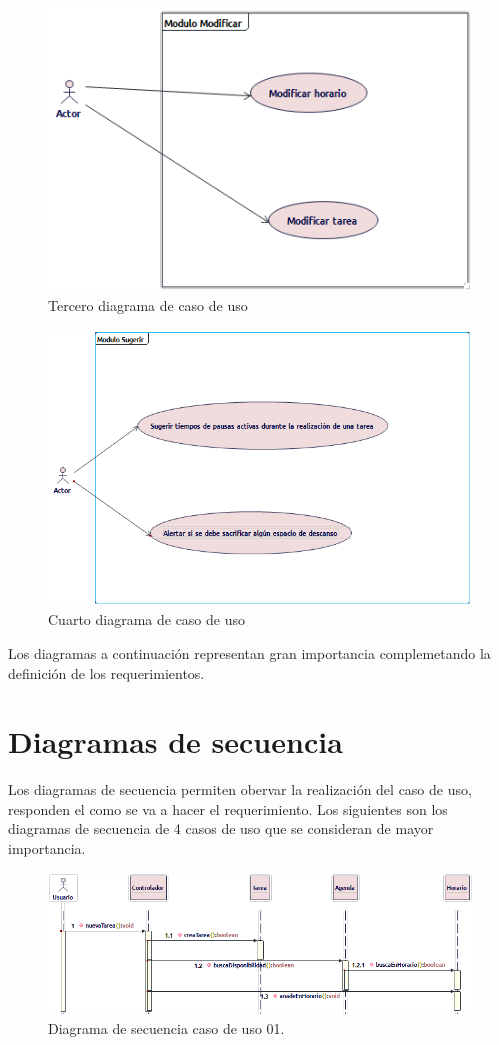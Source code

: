 \begin{figure}[H]
	\centering
	\includegraphics[width=0.7\linewidth]{diseno/requerimientos/imagenes/casouso3}
	\caption{Tercero diagrama de caso de uso}
	\label{fig:gantt}
\end{figure}
\begin{figure}[H]
	\centering
	\includegraphics[width=0.7\linewidth]{diseno/requerimientos/imagenes/casouso4}
	\caption{Cuarto diagrama de caso de uso}
	\label{fig:gantt}
\end{figure}

Los diagramas a continuación representan gran importancia complemetando la definición de los requerimientos.

\section{Diagramas de secuencia}
Los diagramas de secuencia permiten obervar la realización del caso de uso, responden el como se va a hacer el requerimiento. Los siguientes son los diagramas de secuencia de 4 casos de uso que se consideran de mayor importancia.

\begin{figure}[H]
	\centering
	\includegraphics[width=0.7\linewidth]{diseno/requerimientos/imagenes/secuenciaE01.png} 
	\caption{Diagrama de secuencia caso de uso 01.}
	\label{fig:gantt}
\end{figure}

